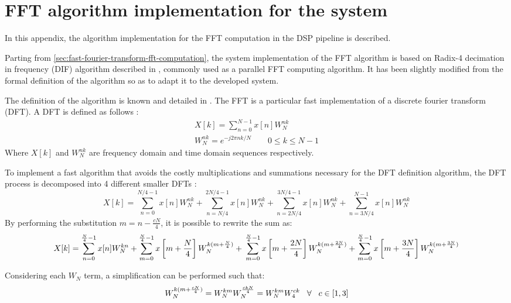 \chapter{FFT algorithm implementation for the system} \label{app:fft}

In this appendix, the algorithm implementation for the FFT computation in the DSP pipeline is described.

Parting from \cref{sec:fast-fourier-transform-fft-computation}, the system implementation of the FFT algorithm is based on Radix-4 decimation in frequency (DIF) algorithm described in \cite{Kosaka, R4DIF}, commonly used as a parallel FFT computing algorithm. It has been slightly modified from the formal definition of the algorithm \cite{Kosaka} so as to adapt it to the developed system.

The definition of the algorithm is known and detailed in \cite{R4DIF}. The FFT is a particular fast implementation of a discrete fourier transform (DFT). A DFT is defined as follows \cite{Oppenheim2013}:
\begin{gather}
	X[k] = \sum_{n=0}^{N-1} x[n] W_N^{nk}\\
	W_N^{nk} = e^{-j2\pi nk /N} \qquad 0 \le k \le N-1
\end{gather}
Where $X[k]$ and $W_N^{nk}$ are frequency domain and time domain sequences respectively.

To implement a fast algorithm that avoids the costly multiplications and summations necessary for the DFT definition algorithm, the DFT process is decomposed into 4 different smaller DFTs \cite{Kosaka}:
\begin{equation}
	X[k] = \sum_{n=0}^{N/4-1} x[n] W_N^{nk} + \sum_{n=N/4}^{2N/4-1} x[n] W_N^{nk} + \sum_{n=2N/4}^{3N/4-1} x[n] W_N^{nk} + \sum_{n=3N/4}^{N-1} x[n] W_N^{nk}
\end{equation}
By performing the substitution $m = n - \frac{cN}{4}$, it is possible to rewrite the sum as:
\begin{equation}
	X[k] = \sum_{n = 0}^{\frac{N}{4} - 1} x[n]W_N^{kn} + \sum_{m = 0}^{\frac{N}{4} - 1} x\left[m + \frac{N}{4}\right]W_N^{k(m + \frac{N}{4})} + \\ \sum_{m = 0}^{\frac{N}{4} - 1} x\left[m + \frac{2N}{4}\right]W_N^{k(m + \frac{2N}{4})} + \sum_{m = 0}^{\frac{N}{4} - 1} x\left[m + \frac{3N}{4}\right]W_N^{k(m + \frac{3N}{4})}
\end{equation}

Considering each $W_N$ term, a simplification can be performed such that:
\begin{equation}
	W_N^{k(m + \frac{cN}{4})} = W_N^{km} W_N^{\frac{ckN}{4}} = W_N^{km}W_4^{ck} \hspace{0.3cm} \forall \hspace{0.3cm} c \in [1, 3]
\end{equation}

